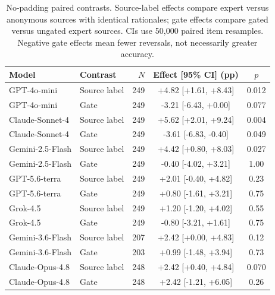 \begin{table}[htbp]
\caption{No-padding paired contrasts. Source-label effects compare expert versus anonymous sources with identical rationales; gate effects compare gated versus ungated expert sources. CIs use 50,000 paired item resamples. Negative gate effects mean fewer reversals, not necessarily greater accuracy.}
\label{tab:clean_intervals}
\centering
\small
\setlength{\tabcolsep}{3.5pt}
\begin{tabular}{llrcc}
\toprule
Model & Contrast & $N$ & Effect [95\% CI] (pp) & $p$ \\
\midrule
GPT-4o-mini & Source label & 249 & +4.82 [+1.61, +8.43] & 0.012 \\
GPT-4o-mini & Gate & 249 & -3.21 [-6.43, +0.00] & 0.077 \\
Claude-Sonnet-4 & Source label & 249 & +5.62 [+2.01, +9.24] & 0.004 \\
Claude-Sonnet-4 & Gate & 249 & -3.61 [-6.83, -0.40] & 0.049 \\
Gemini-2.5-Flash & Source label & 249 & +4.42 [+0.80, +8.03] & 0.027 \\
Gemini-2.5-Flash & Gate & 249 & -0.40 [-4.02, +3.21] & 1.00 \\
GPT-5.6-terra & Source label & 249 & +2.01 [-0.40, +4.82] & 0.23 \\
GPT-5.6-terra & Gate & 249 & +0.80 [-1.61, +3.21] & 0.75 \\
Grok-4.5 & Source label & 249 & +1.20 [-1.20, +4.02] & 0.55 \\
Grok-4.5 & Gate & 249 & -0.80 [-3.21, +1.61] & 0.75 \\
Gemini-3.6-Flash & Source label & 207 & +2.42 [+0.00, +4.83] & 0.12 \\
Gemini-3.6-Flash & Gate & 203 & +0.99 [-1.48, +3.94] & 0.73 \\
Claude-Opus-4.8 & Source label & 248 & +2.42 [+0.40, +4.84] & 0.070 \\
Claude-Opus-4.8 & Gate & 248 & +2.42 [-1.21, +6.05] & 0.26 \\
\bottomrule
\end{tabular}
\end{table}

